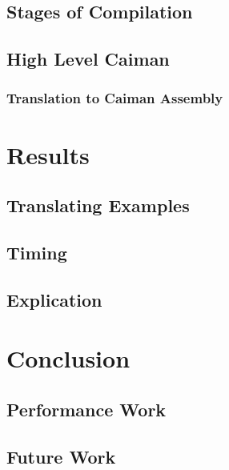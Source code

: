 \subsection{Stages of Compilation}

\subsection{High Level Caiman}

\subsubsection{Translation to Caiman Assembly}

\section{Results}
\label{sec:results}

\subsection{Translating Examples}

\subsection{Timing}

\subsection{Explication}

\section{Conclusion}
\label{sec:conclusion}

\subsection{Performance Work}

\subsection{Future Work}